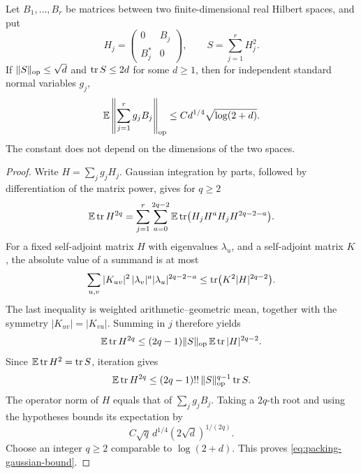 \begin{lemma}\label{lem:packing-gaussian}
Let $B_1,\ldots,B_r$ be matrices between two finite-dimensional real
Hilbert spaces, and put
\[
 H_j=\begin{pmatrix}0&B_j\\ B_j^*&0\end{pmatrix},
 \qquad S=\sum_{j=1}^r H_j^2.
\]
If $\lVert S\rVert_{\rm op}\le\sqrt d$ and $\operatorname{tr} S\le2d$ for some $d\ge1$, then
for independent standard normal variables $g_j$,
\begin{equation}\label{eq:packing-gaussian-bound}
       \mathbb E\left\|\sum_{j=1}^r g_jB_j\right\|_{\rm op}
             \le C d^{1/4}\sqrt{\log(2+d)}.
\end{equation}
The constant does not depend on the dimensions of the two spaces.
\end{lemma}

\begin{proof}
Write $H=\sum_jg_jH_j$.  Gaussian integration by parts, followed by
differentiation of the matrix power, gives for $q\ge2$
\[
 \mathbb E\operatorname{tr} H^{2q}
  =\sum_{j=1}^r\sum_{a=0}^{2q-2}
       \mathbb E\operatorname{tr}\bigl(H_jH^aH_jH^{2q-2-a}\bigr).
\]
For a fixed self-adjoint matrix $H$ with eigenvalues $\lambda_u$, and a
self-adjoint matrix $K$, the absolute value of a summand is at most
\[
 \sum_{u,v}|K_{uv}|^2\,
             |\lambda_v|^a|\lambda_u|^{2q-2-a}
       \le \operatorname{tr}\bigl(K^2|H|^{2q-2}\bigr).
\]
The last inequality is weighted arithmetic--geometric mean, together
with the symmetry $|K_{uv}|=|K_{vu}|$.  Summing in $j$ therefore yields
\begin{equation}\label{eq:packing-moment-recursion}
 \mathbb E\operatorname{tr} H^{2q}
       \le(2q-1)\lVert S\rVert_{\rm op}\,
                         \mathbb E\operatorname{tr} |H|^{2q-2}.
\end{equation}
Since $\mathbb E\operatorname{tr} H^2=\operatorname{tr} S$, iteration gives
\[
 \mathbb E\operatorname{tr} H^{2q}
       \le(2q-1)!!\,\lVert S\rVert_{\rm op}^{q-1}\operatorname{tr} S.
\]
The operator norm of $H$ equals that of $\sum_jg_jB_j$.  Taking a
$2q$-th root and using the hypotheses bounds its expectation by
\[
             C\sqrt q\,d^{1/4}(2\sqrt d)^{1/(2q)}.
\]
Choose an integer $q\ge2$ comparable to $\log(2+d)$.  This proves
\eqref{eq:packing-gaussian-bound}.
\end{proof}

